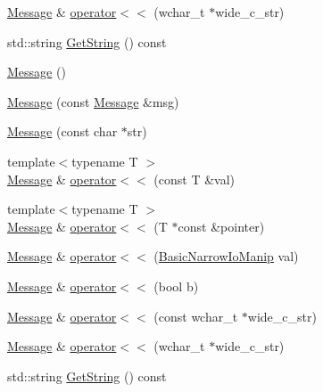 \begin{DoxyCompactItemize}
\mbox{\hyperlink{classtesting_1_1_message}{Message}} \& \mbox{\hyperlink{classtesting_1_1_message_ac1d3a041ac4bb9c929ee746b31a13d6a}{operator$<$$<$}} (wchar\+\_\+t $\ast$wide\+\_\+c\+\_\+str)
\item 
std\+::string \mbox{\hyperlink{classtesting_1_1_message_a2cdc4df62bdcc9df37651a1cf527704e}{Get\+String}} () const
\item 
\mbox{\hyperlink{classtesting_1_1_message_af5ba7216630df9845f18feb64b1a5383}{Message}} ()
\item 
\mbox{\hyperlink{classtesting_1_1_message_ac126e24804817a053bebba0920d94a11}{Message}} (const \mbox{\hyperlink{classtesting_1_1_message}{Message}} \&msg)
\item 
\mbox{\hyperlink{classtesting_1_1_message_a9de694ca239486809fc99fbbea8ac21d}{Message}} (const char $\ast$str)
\item 
{\footnotesize template$<$typename T $>$ }\\\mbox{\hyperlink{classtesting_1_1_message}{Message}} \& \mbox{\hyperlink{classtesting_1_1_message_a2e0e71be52d54c20a75a55fca812721f}{operator$<$$<$}} (const T \&val)
\item 
{\footnotesize template$<$typename T $>$ }\\\mbox{\hyperlink{classtesting_1_1_message}{Message}} \& \mbox{\hyperlink{classtesting_1_1_message_aa3ab685879958f90d2d8cd5b68d10c34}{operator$<$$<$}} (T $\ast$const \&pointer)
\item 
\mbox{\hyperlink{classtesting_1_1_message}{Message}} \& \mbox{\hyperlink{classtesting_1_1_message_a3a71a1c1c8ea52de5852d75483d41453}{operator$<$$<$}} (\mbox{\hyperlink{classtesting_1_1_message_ad398b70e2a11b923cef05c809b0eeb92}{Basic\+Narrow\+Io\+Manip}} val)
\item 
\mbox{\hyperlink{classtesting_1_1_message}{Message}} \& \mbox{\hyperlink{classtesting_1_1_message_a3e1e04f23b1bdfe18adfd59928296346}{operator$<$$<$}} (bool b)
\item 
\mbox{\hyperlink{classtesting_1_1_message}{Message}} \& \mbox{\hyperlink{classtesting_1_1_message_a34774e225944cb6df02db9689d312aae}{operator$<$$<$}} (const wchar\+\_\+t $\ast$wide\+\_\+c\+\_\+str)
\item 
\mbox{\hyperlink{classtesting_1_1_message}{Message}} \& \mbox{\hyperlink{classtesting_1_1_message_aae57eefb3a72a19c11453d630b1d846c}{operator$<$$<$}} (wchar\+\_\+t $\ast$wide\+\_\+c\+\_\+str)
\item 
std\+::string \mbox{\hyperlink{classtesting_1_1_message_a2cdc4df62bdcc9df37651a1cf527704e}{Get\+String}} () const

\end{DoxyCompactItemize}
